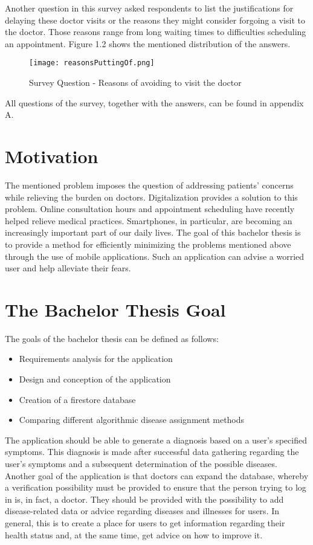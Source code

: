 \noindent 
Another question in this survey asked respondents to list the justifications for delaying these doctor visits or the reasons they might consider forgoing a visit to the doctor. Those reasons range from long waiting times to difficulties scheduling an appointment. Figure 1.2 shows the mentioned distribution of the answers.
\begin{figure}[H]
	\centering
	\texttt{[image: reasonsPuttingOf.png]}
	\caption[Survey Question]{Survey Question - Reasons of avoiding to visit the doctor}
\end{figure}
\noindent 
All questions of the survey, together with the answers, can be found in appendix A.
\section{Motivation}
The mentioned problem imposes the question of addressing patients’ concerns while relieving the burden on doctors. Digitalization provides a solution to this problem. Online consultation hours and appointment scheduling have recently helped relieve medical practices. Smartphones, in particular, are becoming an increasingly important part of our daily lives. The goal of this bachelor thesis is to provide a method for efficiently minimizing the problems mentioned above through the use of mobile applications. Such an application can advise a worried user and help alleviate their fears.

\section{The Bachelor Thesis Goal}
The goals of the bachelor thesis can be defined as follows:
\begin{itemize}
	\item Requirements analysis for the application
	\item Design and conception of the application
	\item Creation of a firestore database
	\item Comparing different algorithmic disease assignment methods
\end{itemize}
The application should be able to generate a diagnosis based on a user's specified symptoms. This diagnosis is made after successful data gathering regarding the user's symptoms and a subsequent determination of the possible diseases. Another goal of the application is that doctors can expand the database, whereby a verification possibility must be provided to ensure that the person trying to log in is, in fact, a doctor. They should be provided with the possibility to add disease-related data or advice regarding diseases and illnesses for users. In general, this is to create a place for users to get information regarding their health status and, at the same time, get advice on how to improve it.


